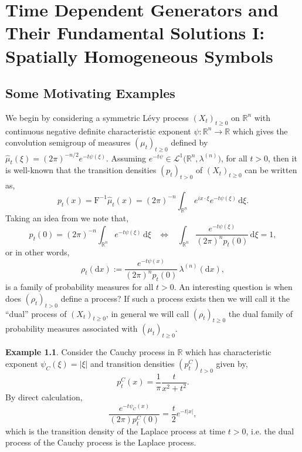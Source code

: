 \documentclass[a4paper, 12pt]{report}
\theoremstyle{remark}
\theoremstyle{definition}
\newtheorem{example}[theorem]{Example}
\begin{document}
\newpage\null

\chapter{Time Dependent Generators and Their Fundamental Solutions I: Spatially Homogeneous Symbols}

\section{Some Motivating Examples}\label{Se.SMEg}

We begin by considering a symmetric L\'evy process $(X_t)_{t \ge 0}$ on $\mathbb{R}^n$ with continuous negative definite characteristic exponent $\psi : \mathbb{R}^n \to \mathbb{R}$ which gives the convolution semigroup of measures $(\mu_t)_{t \ge 0}$ defined by $\hat{\mu}_t(\xi) = (2\pi)^{-n/2}e^{-t\psi(\xi)}$.  Assuming $e^{-t\psi} \in \mathcal{L}^1\big(\mathbb{R}^n, \lambda^{(n)}\big)$, for all $t > 0$, then it is well-known that the transition densities $(p_t)_{t > 0}$ of $(X_t)_{t \ge 0}$ can be written as,
\begin{equation}\label{LPTransitionDensities}
p_t(x) = \mathrm{F}^{-1}\hat{\mu}_t(x)= (2\pi)^{-n}\int_{\mathbb{R}^n}e^{ix\cdot\xi}e^{-t\psi(\xi)}\,\mathrm{d}\xi.
\end{equation}
Taking an idea from \cite{Paper} we note that,
$$
p_t(0) = (2\pi)^{-n}\int_{\mathbb{R}^n}e^{-t\psi(\xi)}\,\mathrm{d}\xi \,\,\,\,\, \Leftrightarrow \,\,\,\,\, \int_{\mathbb{R}^n}\frac{e^{-t\psi(\xi)}}{(2\pi)^np_t(0)}\,\mathrm{d}\xi = 1,
$$
or in other words,
\begin{equation}
\rho_t(\mathrm{d}x) := \frac{e^{-t\psi(x)}}{(2\pi)^np_t(0)}\,\lambda^{(n)}(\mathrm{d}x),\label{DPPM}
\end{equation}
is a family of probability measures for all $t > 0$.  An interesting question is when does $(\rho_t)_{t > 0}$ define a process?  If such a process exists then we will call it the ``dual'' process of $(X_t)_{t \ge 0}$, in general we will call $(\rho_t)_{t \ge 0}$ the dual family of probability measures associated with $(\mu_t)_{t \ge 0}$.

\begin{example}\label{DofCPeg}
Consider the Cauchy process in $\mathbb{R}$ which has characteristic exponent $\psi_C(\xi) = |\xi|$ and transition densities $(p_t^C)_{t > 0}$ given by,
$$
p_t^C(x) = \frac{1}{\pi}\frac{t}{x^2 + t^2}.
$$
By direct calculation,
$$
\frac{e^{-t\psi_C(x)}}{(2\pi)p_t^C(0)} = \frac{t}{2}e^{-t|x|},
$$
which is the transition density of the Laplace process at time $t > 0$, i.e. the dual process of the Cauchy process is the Laplace process.
\end{example}
\end{document}
